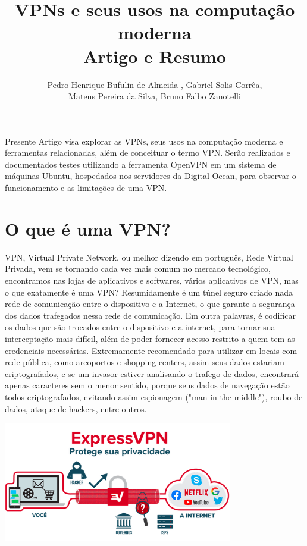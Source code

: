 \documentclass[12pt]{article}
\title{VPNs e seus usos na computação moderna\\ Artigo e Resumo}
\author{Pedro Henrique Bufulin de Almeida \inst{1}, Gabriel Solis Corrêa\inst{2},\\ Mateus Pereira da Silva\inst{3}, Bruno Falbo Zanotelli\inst{4} }
\begin{document}
\maketitle
     
\begin{resumo} 
  Presente Artigo visa explorar as VPNs, seus usos na computação moderna
  e ferramentas relacionadas, além de conceituar o termo VPN. Serão realizados
  e documentados testes utilizando a ferramenta OpenVPN em um sistema de máquinas Ubuntu,
  hospedados nos servidores da Digital Ocean, para observar o funcionamento e as
  limitações de uma VPN.
\end{resumo}


\section{O que é uma VPN?}

VPN, Virtual Private Network, ou melhor dizendo em português, Rede Virtual Privada,
vem se tornando cada vez mais comum no mercado tecnológico, encontramos nas lojas de aplicativos e softwares,
vários aplicativos de VPN, mas o que exatamente é uma VPN?
Resumidamente é um túnel seguro criado nada rede de comunicação entre o dispositivo e a Internet,
o que garante a segurança dos dados trafegados nessa rede de comunicação.
Em outra palavras, é codificar os dados que são trocados entre o dispositivo e a internet,
para tornar sua interceptação mais difícil, além de poder fornecer acesso restrito a quem tem as
credenciais necessárias. Extremamente recomendado para utilizar em locais com rede pública, como areoportos e shopping centers,
assim seus dados estariam criptografados, e se um invasor estiver analisando o trafego de dados,
encontrará apenas caracteres sem o menor sentido, porque seus dados de navegação estão todos criptografados,
evitando assim espionagem ("man-in-the-middle"), roubo de dados, ataque de hackers, entre outros.

\center
\includegraphics[width=10cm]{images/what-is-vpn-pt_3x.png}
\end{document}
